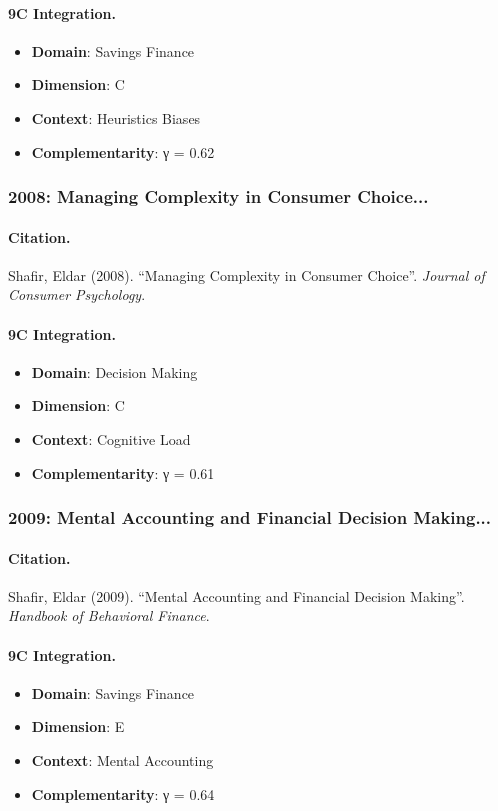 \paragraph{9C Integration.}
\begin{itemize}[nosep]
  \item \textbf{Domain}: Savings Finance
  \item \textbf{Dimension}: C
  \item \textbf{Context}: Heuristics Biases
  \item \textbf{Complementarity}: γ = 0.62
\end{itemize}


\subsubsection{2008: Managing Complexity in Consumer Choice...}

\paragraph{Citation.}
Shafir, Eldar (2008). ``Managing Complexity in Consumer Choice''. \textit{Journal of Consumer Psychology}.

\paragraph{9C Integration.}
\begin{itemize}[nosep]
  \item \textbf{Domain}: Decision Making
  \item \textbf{Dimension}: C
  \item \textbf{Context}: Cognitive Load
  \item \textbf{Complementarity}: γ = 0.61
\end{itemize}


\subsubsection{2009: Mental Accounting and Financial Decision Making...}

\paragraph{Citation.}
Shafir, Eldar (2009). ``Mental Accounting and Financial Decision Making''. \textit{Handbook of Behavioral Finance}.

\paragraph{9C Integration.}
\begin{itemize}[nosep]
  \item \textbf{Domain}: Savings Finance
  \item \textbf{Dimension}: E
  \item \textbf{Context}: Mental Accounting
  \item \textbf{Complementarity}: γ = 0.64
\end{itemize}


